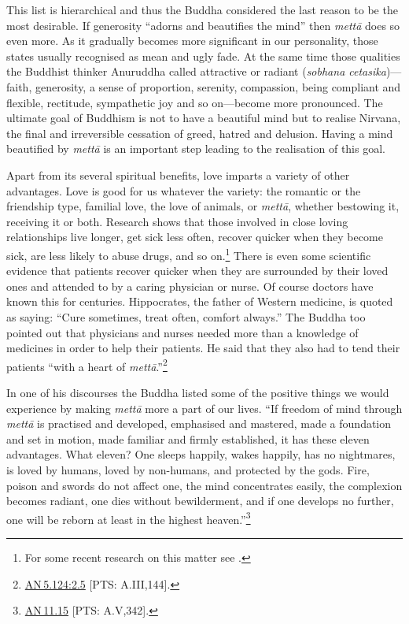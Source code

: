 \documentclass[10pt, openright]{book}
\begin{document}
This list is hierarchical and thus the Buddha considered the last reason to be the most desirable. If generosity “adorns and beautifies the mind” then \textit{mettā} does so even more. As it gradually becomes more significant in our personality, those states usually recognised as mean and ugly fade. At the same time those qualities the Buddhist thinker Anuruddha called attractive or radiant (\textit{sobhana cetasika})—faith, generosity, a sense of proportion, serenity, compassion, being compliant and flexible, rectitude, sympathetic joy and so on—become more pronounced. The ultimate goal of Buddhism is not to have a beautiful mind but to realise Nirvana, the final and irreversible cessation of greed, hatred and delusion. Having a mind beautified by \textit{mettā} is an important step leading to the realisation of this goal.


Apart from its several spiritual benefits, love imparts a variety of other advantages. Love is good for us whatever the variety: the romantic or the friendship type, familial love, the love of animals, or \textit{mettā}, whether bestowing it, receiving it or both. Research shows that those involved in close loving relationships live longer, get sick less often, recover quicker when they become sick, are less likely to abuse drugs, and so on.\footnote {For some recent research on this matter see \cite{Germer 2009}.} There is even some scientific evidence that patients recover quicker when they are surrounded by their loved ones and attended to by a caring physician or nurse. Of course doctors have known this for centuries. Hippocrates, the father of Western medicine, is quoted as saying: “Cure sometimes, treat often, comfort always.” The Buddha too pointed out that physicians and nurses needed more than a knowledge of medicines in order to help their patients. He said that they also had to tend their patients “with a heart of \textit{mettā}.”\footnote {\href{https://suttacentral.net/an5.124/en/sujato\#2.5}{AN 5.124:2.5} [PTS: A.III,144].}


In one of his discourses the Buddha listed some of the positive things we would experience by making \textit{mettā} more a part of our lives. “If freedom of mind through \textit{mettā} is practised and developed, emphasised and mastered, made a foundation and set in motion, made familiar and firmly established, it has these eleven advantages. What eleven? One sleeps happily, wakes happily, has no nightmares, is loved by humans, loved by non-humans, and protected by the gods. Fire, poison and swords do not affect one, the mind concentrates easily, the complexion becomes radiant, one dies without bewilderment, and if one develops no further, one will be reborn at least in the highest heaven.”\footnote {\href{https://suttacentral.net/an11.15/en/sujato}{AN 11.15} [PTS: A.V,342].}
\end{document}
